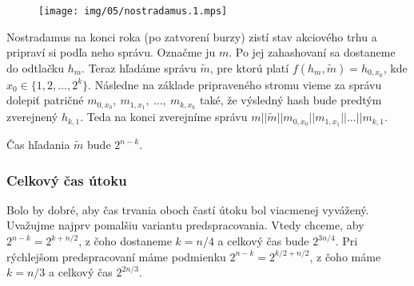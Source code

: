 \begin{figure}[h]
    \centering
    \texttt{[image: img/05/nostradamus.1.mps]}
\end{figure}

Nostradamus na konci roka (po zatvorení burzy) zistí stav akciového
trhu a pripraví si podľa neho správu.
Označme ju $m$. Po jej zahashovaní sa dostaneme do odtlačku
$h_m$. Teraz hľadáme správu $\tilde{m}$, pre ktorú platí
$f(h_m, \tilde{m}) = h_{0,x_0}$, kde $x_0 \in \{1, 2, \dots, 2^k\}$.
Následne na základe pripraveného stromu vieme za správu dolepiť patričné 
$m_{0,x_0},\ m_{1,x_1},\ \dots,\ m_{k,x_k}$ také, že
výsledný hash bude predtým zverejnený $h_{k,1}$.
Teda na konci zverejníme správu 
$m || \tilde{m} || m_{0,x_0} || m_{1,x_1} || \dots || m_{k, 1}$.

Čas hľadania $\tilde{m}$ bude $2^{n-k}$.

\subsubsection{Celkový čas útoku}
Bolo by dobré, aby čas trvania oboch častí útoku bol viacmenej vyvážený. 
Uvažujme najprv pomalšiu variantu predspracovania.
Vtedy chceme, aby $2^{n-k} = 2^{k+n/2}$, z čoho dostaneme
$k=n/4$ a celkový čas bude $2^{3n/4}$.
Pri rýchlejšom predspracovaní máme podmienku $2^{n-k} = 2^{k/2 + n/2}$,
z čoho máme $k = n/3$ a celkový čas $2^{2n/3}$.

